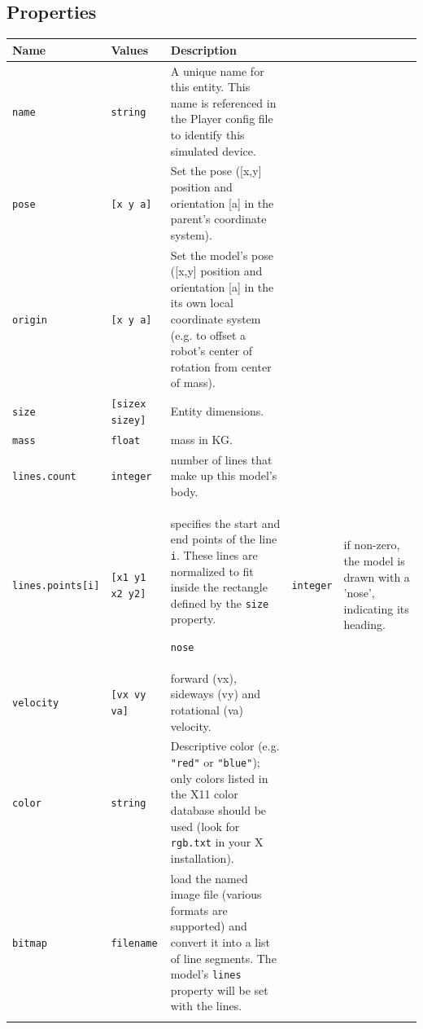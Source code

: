 \documentclass[letter,11pt,twoside]{report}
\begin{document}
\subsection*{Properties}
\begin{tabularx}{\columnwidth}{llX}
\hline
Name & Values & Description \\
\hline

\verb'name' & \verb'string' & A unique name for this entity. This name
is referenced in the Player config file to identify this simulated
device.\\

\verb'pose' & \verb'[x y a]' & Set the pose ([x,y] position and
orientation [a] in the parent's coordinate system).\\

\verb'origin' & \verb'[x y a]' & Set the model's pose ([x,y] position
and orientation [a] in the its own local coordinate system (e.g. to
offset a robot's center of rotation from center of mass).\\

\verb'size' & \verb'[sizex sizey]' & Entity dimensions.\\ 

\verb'mass'& \verb'float' & mass in KG.\\

\verb'lines.count'& \verb'integer' & number of lines that make up this
model's body.\\

\verb'lines.points[i]' & \verb'[x1 y1 x2 y2]' & specifies the start
and end points of the line \verb'i'. These lines are normalized to fit
inside the rectangle defined by the \verb'size' property.\

\verb'nose'& \verb'integer' & if non-zero, the model is drawn with a
'nose', indicating its heading.\\

\verb'velocity'& \verb'[vx vy va]' & forward (vx), sideways (vy)
and rotational (va) velocity.\\

\verb'color' & \verb'string' & Descriptive color (e.g. \verb'"red"' or
\verb'"blue"'); only colors listed in the X11 color database should be used
(look for \verb'rgb.txt' in your X installation).\\

\verb'bitmap' & \verb'filename' & load the named image file (various
formats are supported) and convert it into a list of line
segments. The model's \verb'lines' property will be set with the
lines.\\


\\
\hline
\end{tabularx}
\end{document}
